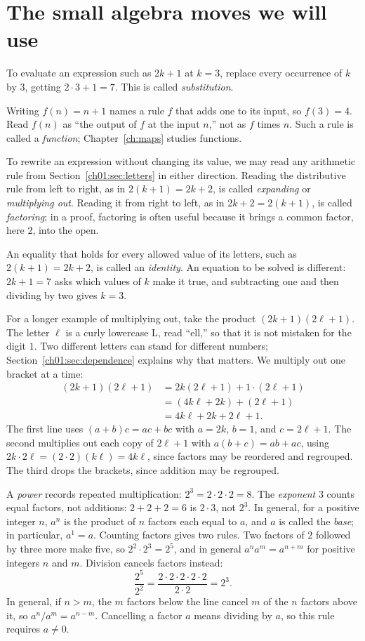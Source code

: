 \section{The small algebra moves we will use}\label{ch01:sec:algebra}
To evaluate an expression such as $2k+1$ at $k=3$, replace every occurrence of $k$ by $3$, getting $2\cdot3+1=7$. This is called \emph{substitution}.

Writing $f(n)=n+1$ names a rule $f$ that adds one to its input, so $f(3)=4$. Read $f(n)$ as ``the output of $f$ at the input $n$,'' not as $f$ times $n$. Such a rule is called a \emph{function}; Chapter~\ref{ch:maps} studies functions.

To rewrite an expression without changing its value, we may read any arithmetic rule from Section~\ref{ch01:sec:letters} in either direction. Reading the distributive rule from left to right, as in $2(k+1)=2k+2$, is called \emph{expanding} or \emph{multiplying out}. Reading it from right to left, as in $2k+2=2(k+1)$, is called \emph{factoring}; in a proof, factoring is often useful because it brings a common factor, here $2$, into the open.

An equality that holds for every allowed value of its letters, such as $2(k+1)=2k+2$, is called an \emph{identity}. An equation to be solved is different: $2k+1=7$ asks which values of $k$ make it true, and subtracting one and then dividing by two gives $k=3$.

For a longer example of multiplying out, take the product $(2k+1)(2\ell+1)$. The letter $\ell$ is a curly lowercase L, read ``ell,'' so that it is not mistaken for the digit $1$. Two different letters can stand for different numbers; Section~\ref{ch01:sec:dependence} explains why that matters. We multiply out one bracket at a time:
\begin{align*}
 (2k+1)(2\ell+1)
 &=2k(2\ell+1)+1\cdot(2\ell+1)\\
 &=(4k\ell+2k)+(2\ell+1)\\
 &=4k\ell+2k+2\ell+1.
\end{align*}
The first line uses $(a+b)c=ac+bc$ with $a=2k$, $b=1$, and $c=2\ell+1$. The second multiplies out each copy of $2\ell+1$ with $a(b+c)=ab+ac$, using $2k\cdot2\ell=(2\cdot2)(k\ell)=4k\ell$, since factors may be reordered and regrouped. The third drops the brackets, since addition may be regrouped.

A \emph{power} records repeated multiplication: $2^3=2\cdot2\cdot2=8$. The \emph{exponent} $3$ counts equal factors, not additions: $2+2+2=6$ is $2\cdot3$, not $2^3$. In general, for a positive integer $n$, $a^n$ is the product of $n$ factors each equal to $a$, and $a$ is called the \emph{base}; in particular, $a^1=a$. Counting factors gives two rules. Two factors of $2$ followed by three more make five, so $2^2\cdot2^3=2^5$, and in general $a^na^m=a^{n+m}$ for positive integers $n$ and $m$. Division cancels factors instead:
\[
\frac{2^5}{2^2}=\frac{2\cdot2\cdot2\cdot2\cdot2}{2\cdot2}=2^3.
\]
In general, if $n>m$, the $m$ factors below the line cancel $m$ of the $n$ factors above it, so $a^n/a^m=a^{n-m}$. Cancelling a factor $a$ means dividing by $a$, so this rule requires $a\ne0$.

